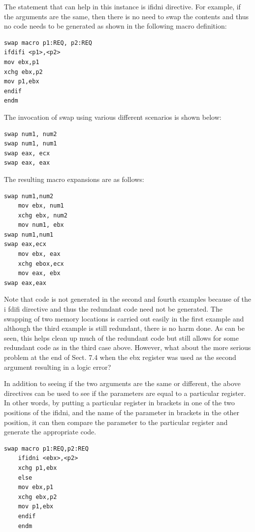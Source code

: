 \documentclass[10pt]{book}
\begin{document}
\begin{center}
\begin{center}
The statement that can help in this instance is ifidni directive. For example, if the arguments are the same, then there is no need to swap the contents and thus no code needs to be generated as shown in the following macro definition:

\begin{verbatim}
swap macro p1:REQ, p2:REQ
ifdifi <p1>,<p2>
mov ebx,p1
xchg ebx,p2
mov p1,ebx
endif
endm
\end{verbatim}

The invocation of swap using various different scenarios is shown below:

\begin{verbatim}
swap num1, num2
swap num1, num1
swap eax, ecx
swap eax, eax
\end{verbatim}

The resulting macro expansions are as follows:

\begin{verbatim}
swap num1,num2
    mov ebx, num1
    xchg ebx, num2
    mov num1, ebx
swap num1,num1
swap eax,ecx
    mov ebx, eax
    xchg ebox,ecx
    mov eax, ebx
swap eax,eax
\end{verbatim}

Note that code is not generated in the second and fourth examples because of the i fdifi directive and thus the redundant code need not be generated. The swapping of two memory locations is carried out easily in the first example and although the third example is still redundant, there is no harm done. As can be seen, this helps clean up much of the redundant code but still allows for some redundant code as in the third case above. However, what about the more serious problem at the end of Sect. 7.4 when the ebx register was used as the second argument resulting in a logic error?

In addition to seeing if the two arguments are the same or different, the above directives can be used to see if the parameters are equal to a particular register. In other words, by putting a particular register in brackets in one of the two positions of the ifidni, and the name of the parameter in brackets in the other position, it can then compare the parameter to the particular register and generate the appropriate code.

\begin{verbatim}
swap macro p1:REQ,p2:REQ
    ifidni <ebx>,<p2>
    xchg p1,ebx
    else
    mov ebx,p1
    xchg ebx,p2
    mov p1,ebx
    endif
    endm
\end{verbatim}


\end{center}
\end{center}
\end{document}
